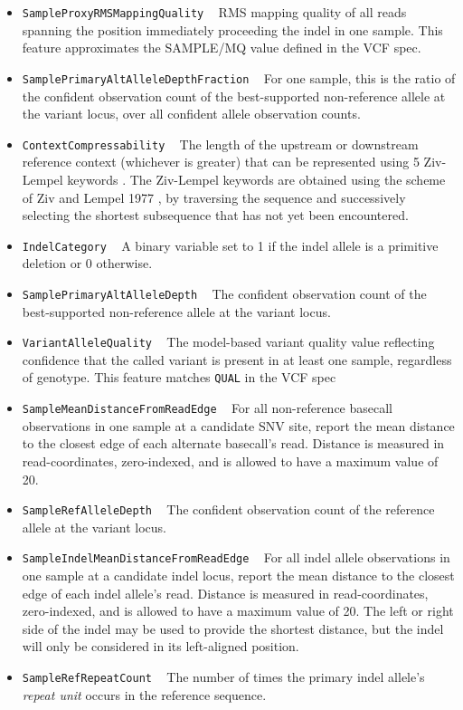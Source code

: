 \documentclass{article}
\begin{document}
\begin{itemize}
    \item \texttt{SampleProxyRMSMappingQuality} ~ RMS mapping quality of all reads spanning the position immediately proceeding the indel in one sample. This feature approximates the SAMPLE/MQ value defined in the VCF spec.

    \item \texttt{SamplePrimaryAltAlleleDepthFraction} ~ For one sample, this is the ratio of the confident observation count of the best-supported non-reference allele at the variant locus, over all confident allele observation counts.

    \item \texttt{ContextCompressability} ~ The length of the upstream or downstream reference context (whichever is greater) that can be represented using 5 Ziv-Lempel keywords \cite{lesne2009,ziv1977}. The Ziv-Lempel keywords are obtained using the scheme of Ziv and Lempel 1977 \cite{ziv1977}, by traversing the sequence and successively selecting the shortest subsequence that has not yet been encountered.

    \item \texttt{IndelCategory} ~ A binary variable set to 1 if the indel allele is a primitive deletion or 0 otherwise.

    \item \texttt{SamplePrimaryAltAlleleDepth} ~ The confident observation count of the best-supported non-reference allele at the variant locus.

    \item \texttt{VariantAlleleQuality} ~ The model-based variant quality value reflecting confidence that the called variant is present in at least one sample, regardless of genotype. This feature matches \texttt{QUAL} in the VCF spec

    \item \texttt{SampleMeanDistanceFromReadEdge} ~ For all non-reference basecall observations in one sample at a candidate SNV site, report the mean distance to the closest edge of each alternate basecall's read. Distance is measured in read-coordinates, zero-indexed, and is allowed to have a maximum value of 20.

    \item \texttt{SampleRefAlleleDepth} ~ The confident observation count of the reference allele at the variant locus.

    \item \texttt{SampleIndelMeanDistanceFromReadEdge} ~ For all indel allele observations in one sample at a candidate indel locus, report the mean distance to the closest edge of each indel allele's read. Distance is measured in read-coordinates, zero-indexed, and is allowed to have a maximum value of 20. The left or right side of the indel may be used to provide the shortest distance, but the indel will only be considered in its left-aligned position.

    \item \texttt{SampleRefRepeatCount} ~ The number of times the primary indel allele's \emph{repeat unit} occurs in the reference sequence.

\end{itemize}
\end{document}
